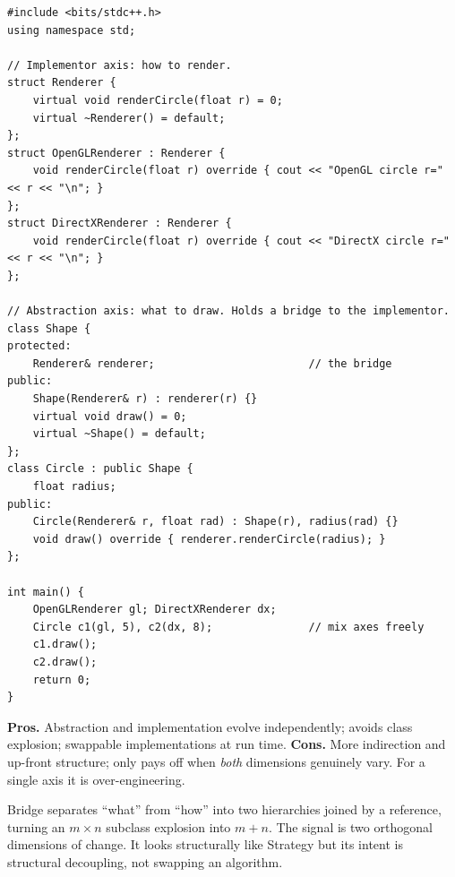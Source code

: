 \begin{lstlisting}
#include <bits/stdc++.h>
using namespace std;

// Implementor axis: how to render.
struct Renderer {
    virtual void renderCircle(float r) = 0;
    virtual ~Renderer() = default;
};
struct OpenGLRenderer : Renderer {
    void renderCircle(float r) override { cout << "OpenGL circle r=" << r << "\n"; }
};
struct DirectXRenderer : Renderer {
    void renderCircle(float r) override { cout << "DirectX circle r=" << r << "\n"; }
};

// Abstraction axis: what to draw. Holds a bridge to the implementor.
class Shape {
protected:
    Renderer& renderer;                        // the bridge
public:
    Shape(Renderer& r) : renderer(r) {}
    virtual void draw() = 0;
    virtual ~Shape() = default;
};
class Circle : public Shape {
    float radius;
public:
    Circle(Renderer& r, float rad) : Shape(r), radius(rad) {}
    void draw() override { renderer.renderCircle(radius); }
};

int main() {
    OpenGLRenderer gl; DirectXRenderer dx;
    Circle c1(gl, 5), c2(dx, 8);               // mix axes freely
    c1.draw();
    c2.draw();
    return 0;
}
\end{lstlisting}

\begin{complexitybox}
\textbf{Pros.} Abstraction and implementation evolve independently; avoids
class explosion; swappable implementations at run time. \textbf{Cons.}
More indirection and up-front structure; only pays off when \emph{both}
dimensions genuinely vary. For a single axis it is over-engineering.
\end{complexitybox}

\begin{takeawaybox}
Bridge separates ``what'' from ``how'' into two hierarchies joined by a
reference, turning an $m\times n$ subclass explosion into $m+n$. The
signal is two orthogonal dimensions of change. It looks structurally like
Strategy but its intent is structural decoupling, not swapping an
algorithm.
\end{takeawaybox}
